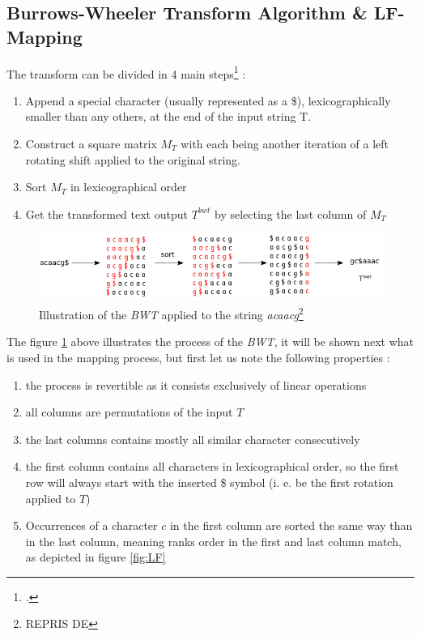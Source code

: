 \subsection{Burrows-Wheeler Transform Algorithm \& LF-Mapping}

The transform can be divided in 4 main steps\footcite{BWT0} :
\begin{enumerate}
\item Append a special character (usually represented as a \$), lexicographically smaller than any others, at the end of the input string \textrm{T}.
\item Construct a square matrix $M_T$ with each being another iteration of a left rotating shift applied to the original string.
\item Sort $M_T$ in lexicographical order
\item Get the transformed text output $T^{bwt}$ by selecting the last column of $M_T$ 
\end{enumerate}

\begin{figure}[h]
\centering
\includegraphics[scale=0.65]{Figures/bwt.png}
\caption{Illustration of the \textsl{BWT} applied to the string \textit{acaacg}\footnote{REPRIS DE}}
 \label{fig:bwt}
 \end{figure}
The figure \ref{fig:bwt} above illustrates the process of the \textsl{BWT}, it will be shown next what is used in the mapping process, but first let us note the following properties :
\begin{enumerate}
\item the process is revertible as it consists exclusively of linear operations
\item all columns are permutations of the input $T$
\item the last columns contains mostly all similar character consecutively
\item the first column contains all characters in lexicographical order, so the first row will always start with the inserted \$ symbol (i. e. be the first rotation applied to $T$)
\item Occurrences of a character $c$ in the first column are sorted the same way than in the last column, meaning ranks order in the first and last column match, as depicted in figure \ref{fig:LF}
\end{enumerate}



